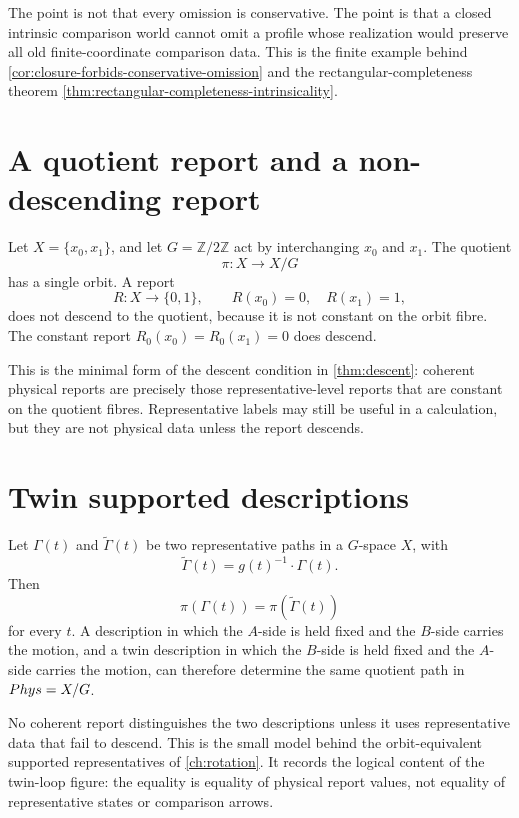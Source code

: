 The point is not that every omission is conservative.  The point is that
a closed intrinsic comparison world cannot omit a profile whose
realization would preserve all old finite-coordinate comparison data.
This is the finite example behind
\cref{cor:closure-forbids-conservative-omission} and the
rectangular-completeness theorem
\cref{thm:rectangular-completeness-intrinsicality}.

\section{A quotient report and a non-descending report}
\label{app:example-nondescending-report}
Let \(X=\{x_0,x_1\}\), and let \(G=\mathbb Z/2\mathbb Z\) act by
interchanging \(x_0\) and \(x_1\).  The quotient
\[
	\pi:X\to X/G
\]
has a single orbit.  A report
\[
	R:X\to\{0,1\},\qquad R(x_0)=0,\quad R(x_1)=1,
\]
does not descend to the quotient, because it is not constant on the
orbit fibre.  The constant report \(R_0(x_0)=R_0(x_1)=0\) does descend.

This is the minimal form of the descent condition in
\cref{thm:descent}: coherent physical reports are precisely those
representative-level reports that are constant on the quotient fibres.
Representative labels may still be useful in a calculation, but they
are not physical data unless the report descends.

\section{Twin supported descriptions}
\label{app:example-twin-descriptions}
Let \(\Gamma(t)\) and \(\widetilde\Gamma(t)\) be two representative
paths in a \(G\)-space \(X\), with
\[
	\widetilde\Gamma(t)=g(t)^{-1}\cdot\Gamma(t).
\]
Then
\[
	\pi(\Gamma(t))=\pi(\widetilde\Gamma(t))
\]
for every \(t\).  A description in which the \(A\)-side is held fixed
and the \(B\)-side carries the motion, and a twin description in which
the \(B\)-side is held fixed and the \(A\)-side carries the motion, can
therefore determine the same quotient path in \(Phys=X/G\).

No coherent report distinguishes the two descriptions unless it uses
representative data that fail to descend.  This is the small model
behind the orbit-equivalent supported representatives of
\cref{ch:rotation}.  It records the logical content of the twin-loop
figure: the equality is equality of physical report values, not equality
of representative states or comparison arrows.

